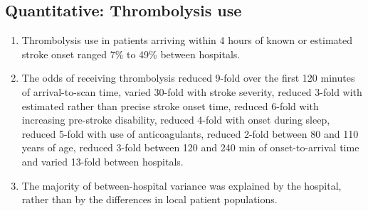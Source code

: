 \subsection{Quantitative: Thrombolysis use}

\begin{enumerate}
    \item Thrombolysis use in patients arriving within 4 hours of known or estimated stroke onset ranged 7\% to 49\% between hospitals.

    \item The odds of receiving thrombolysis reduced 9-fold over the first 120 minutes of arrival-to-scan time, varied 30-fold with stroke severity, reduced 3-fold with estimated rather than precise stroke onset time, reduced 6-fold with increasing pre-stroke disability, reduced 4-fold with onset during sleep, reduced 5-fold with use of anticoagulants, reduced 2-fold between 80 and 110 years of age, reduced 3-fold between 120 and 240 min of onset-to-arrival time and varied 13-fold between hospitals.
    
    \item The majority of between-hospital variance was explained by the hospital, rather than by the differences in local patient populations.
\end{enumerate}


